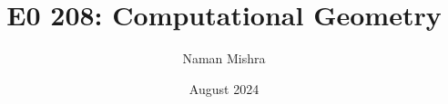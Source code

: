 \documentclass[12pt]{report}
\title{E0 208: Computational Geometry}
\author{Naman Mishra}
\date{August 2024}
\begin{document}
\maketitle
\tableofcontents
\listoflecture
%    
%    
%    
%    
%    
    
    
    
\end{document}

